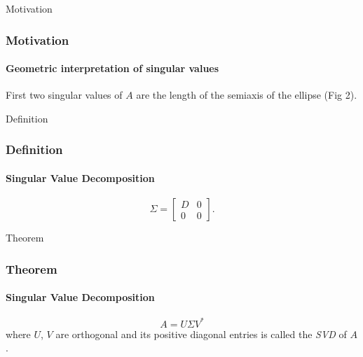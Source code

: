 \documentclass{beamer}
\begin{document}

\begin{frame}{Motivation}

\frametitle{Motivation}
\framesubtitle{Geometric interpretation of singular values}

First two singular values of $A$ are the length of the semiaxis
of the ellipse (Fig 2).

\end{frame}


\begin{frame}{Definition}

\frametitle{Definition}
\framesubtitle{Singular Value Decomposition}

\begin{equation}
\Sigma = \begin{bmatrix}D & 0 \\ 0 & 0 \end{bmatrix}.
\end{equation}

\end{frame}


\begin{frame}{Theorem}

\frametitle{Theorem}
\framesubtitle{Singular Value Decomposition}

\begin{equation}
A = U\Sigma V^*
\end{equation}
where $U$, $V$ are orthogonal and its positive diagonal
entries is called the \emph{SVD} of $A$.

\end{frame}

\end{document}
